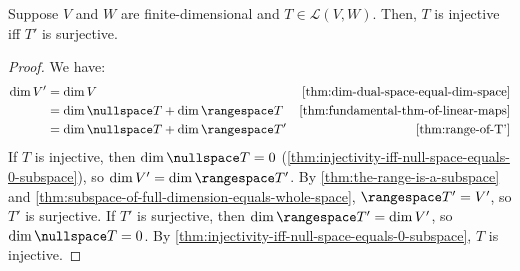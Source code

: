 \documentclass{article}
\begin{document}
\begin{theorem}
  \label{thm:T-injective-iff-T'-surjective}
  Suppose $V$ and $W$ are finite-dimensional and $T \in \mathcal{L}(V,
  W)$. Then, $T$ is injective iff $T'$ is surjective.
\end{theorem}
\begin{proof}
  We have:
  \begin{align*}
    \dim V' &= \dim V &
                        \text{\cref{thm:dim-dual-space-equal-dim-space}} \\
            &= \dim \nullspace T + \dim \rangespace T &
                                                        \text{\cref{thm:fundamental-thm-of-linear-maps}} \\
    &= \dim \nullspace T + \dim \rangespace T' &
                                                 \text{\cref{thm:range-of-T'}}
    \\
  \end{align*}
  If $T$ is injective, then $\dim \nullspace T = 0$
  (\cref{thm:injectivity-iff-null-space-equals-0-subspace}), so $\dim
  V' = \dim \rangespace T'$. By \cref{thm:the-range-is-a-subspace} and
  \cref{thm:subspace-of-full-dimension-equals-whole-space},
  $\rangespace T' = V'$, so $T'$ is surjective. If $T'$ is surjective,
  then $\dim \rangespace T' = \dim V'$, so $\dim \nullspace T = 0$. By
  \cref{thm:injectivity-iff-null-space-equals-0-subspace}, $T$ is injective.
\end{proof}
\end{document}
